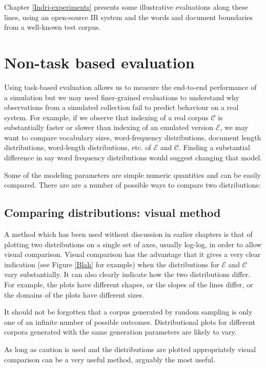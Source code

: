 \documentclass[11pt]{report}
\newcommand{\script}[1]{$\mathcal{#1}$}
\begin{document}
Chapter \ref{Indri-experiments} presents some illustrative evaluations along
these lines, using an open-source IR system and the words and document
boundaries from a well-known test corpus.


\section{Non-task based evaluation}
Using task-based evaluation allows us to measure the end-to-end
performance of a simulation but we may need finer-grained evaluations
to understand why observations from a simulated collection fail to
predict behaviour on a real system.  For example, if we observe that
indexing of a real corpus \script{C} is substantially faster or slower than
indexing of an emulated version \script{E}, we may want to compare
vocabulary sizes, word-frequency distributions, document length
distributions, word-length distributions, etc. of \script{E} and
\script{C}.  Finding a substantial difference in say word frequency
distributions would suggest changing that model.

Some of the modeling parameters are simple numeric quantities and can
be easily compared.  There are are a number of possible ways to compare two
distributions:

\subsection{Comparing distributions: visual method}

A method which has been used without discussion in earlier chapters
is that of plotting two distributions on a single set of axes, usually
log-log, in order to allow visual comparison.  Visual comparison has the 
advantage that it gives a very clear indication (see Figure \ref{Blah} for example) when
the  distributions for \script{E} and
\script{C} vary substantially.  It can also clearly indicate
how the two distributions differ.  For example, the plots have
different shapes, or the slopes of the lines differ, or the domains of
the plots have different sizes.

It should not be forgotten that a
corpus generated by random sampling is only one of an infinite number
of possible outcomes.  Distributional plots for different corpora
generated with the same generation parameters are likely to vary. 

As long as caution is used 
and the distributions are plotted appropriately visual comparison can
be a very useful method, arguably the most useful.
\end{document}
